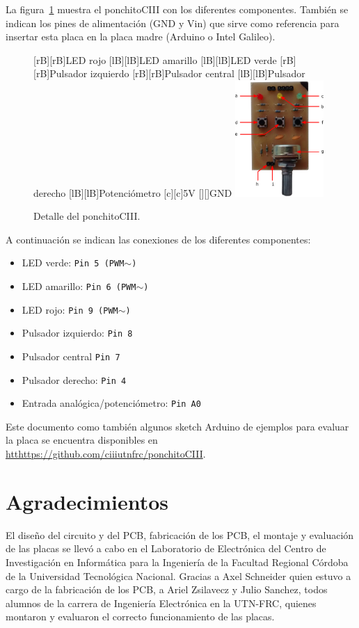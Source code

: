 \documentclass[a4paper]{article}
\begin{document}
La figura~\ref{fig:ponchito} muestra el ponchitoCIII con los diferentes componentes.
También se indican los pines de alimentación (GND y Vin) que sirve como referencia para insertar esta placa en la placa madre (Arduino o Intel Galileo).
\begin{figure}[hbt]
  \centering
  [rB][rB]{LED rojo}
  [lB][lB]{LED amarillo}
  [lB][lB]{LED verde}
  [rB][rB]{Pulsador izquierdo}
  [rB][rB]{Pulsador central}
  [lB][lB]{Pulsador derecho}
  [lB][lB]{Potenciómetro}
  [c][c]{5V}
  [][]{GND}
  \includegraphics[width=0.30\textwidth]{ponchito.eps}
  \caption{Detalle del ponchitoCIII.}
  \label{fig:ponchito}
\end{figure}

\bigskip
A continuación se indican las conexiones de los diferentes componentes:
\begin{itemize}
  \item  LED verde: \texttt{Pin 5 (PWM$\sim$)}
  \item  LED amarillo: \texttt{Pin 6 (PWM$\sim$)}
  \item  LED rojo: \texttt{Pin 9 (PWM$\sim$)}
  \item  Pulsador izquierdo: \texttt{Pin 8}
  \item  Pulsador central \texttt{Pin 7}
  \item  Pulsador derecho: \texttt{Pin 4}
  \item  Entrada analógica/potenciómetro: \texttt{Pin A0}
\end{itemize}

Este documento como también algunos sketch Arduino de ejemplos para evaluar la placa se encuentra disponibles en \href{htthttps://github.com/ciiiutnfrc/ponchitoCIII}{htthttps://github.com/ciiiutnfrc/ponchitoCIII}.

\section*{Agradecimientos}
El diseño del circuito y del PCB, fabricación de los PCB, el montaje y evaluación de las placas se llevó a cabo en el Laboratorio de Electrónica del Centro de Investigación en Informática para la Ingeniería de la Facultad Regional Córdoba de la Universidad Tecnológica Nacional.
Gracias a Axel Schneider quien estuvo a cargo de la fabricación de los PCB, a Ariel Zsilavecz y Julio Sanchez, todos alumnos de la carrera de Ingeniería Electrónica en la UTN-FRC, quienes montaron y evaluaron el correcto funcionamiento de las placas.
\end{document}
